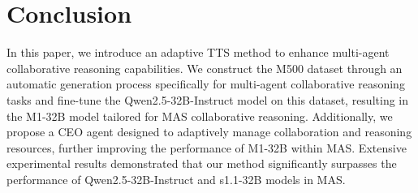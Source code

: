 \section{Conclusion}
In this paper, we introduce an adaptive TTS method to enhance multi-agent collaborative reasoning capabilities. We construct the M500 dataset through an automatic generation process specifically for multi-agent collaborative reasoning tasks and fine-tune the Qwen2.5-32B-Instruct model on this dataset, resulting in the M1-32B model tailored for MAS collaborative reasoning. Additionally, we propose a CEO agent designed to adaptively manage collaboration and reasoning resources, further improving the performance of M1-32B within MAS. Extensive experimental results demonstrated that our method significantly surpasses the performance of Qwen2.5-32B-Instruct and s1.1-32B models in MAS.